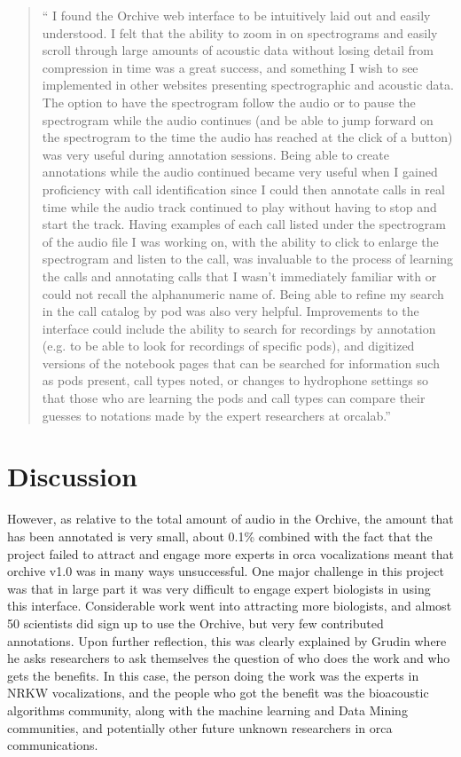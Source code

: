 \documentclass[12pt,oneside]{book}
\begin{document}
\begin{quote}
`` I found the Orchive web interface to be intuitively laid out and
  easily understood. I felt that the ability to zoom in on
  spectrograms and easily scroll through large amounts of acoustic
  data without losing detail from compression in time was a great
  success, and something I wish to see implemented in other websites
  presenting spectrographic and acoustic data.  The option to have the
  spectrogram follow the audio or to pause the spectrogram while the
  audio continues (and be able to jump forward on the spectrogram to
  the time the audio has reached at the click of a button) was very
  useful during annotation sessions. Being able to create annotations
  while the audio continued became very useful when I gained
  proficiency with call identification since I could then annotate
  calls in real time while the audio track continued to play without
  having to stop and start the track. Having examples of each call
  listed under the spectrogram of the audio file I was working on,
  with the ability to click to enlarge the spectrogram and listen to
  the call, was invaluable to the process of learning the calls and
  annotating calls that I wasn't immediately familiar with or could
  not recall the alphanumeric name of.  Being able to refine my search
  in the call catalog by pod was also very helpful. Improvements to
  the interface could include the ability to search for recordings by
  annotation (e.g. to be able to look for recordings of specific
  pods), and digitized versions of the notebook pages that can be
  searched for information such as pods present, call types noted, or
  changes to hydrophone settings so that those who are learning the
  pods and call types can compare their guesses to notations made by
  the expert researchers at orcalab.''
\end{quote}

\section{Discussion}

However, as relative to the total amount of audio in the Orchive, the
amount that has been annotated is very small, about 0.1\% combined
with the fact that the project failed to attract and engage more
experts in orca vocalizations meant that orchive v1.0 was in many ways
unsuccessful.  One major challenge in this project was that in large
part it was very difficult to engage expert biologists in using this
interface.  Considerable work went into attracting more biologists,
and almost 50 scientists did sign up to use the Orchive, but very few
contributed annotations.  Upon further reflection, this was clearly
explained by Grudin \cite{grudin1988cscw} where he asks researchers to
ask themselves the question of who does the work and who gets the
benefits.  In this case, the person doing the work was the experts in
NRKW vocalizations, and the people who got
the benefit was the bioacoustic algorithms community, along with the
machine learning and Data Mining communities, and potentially other
future unknown researchers in orca communications.
\end{document}
